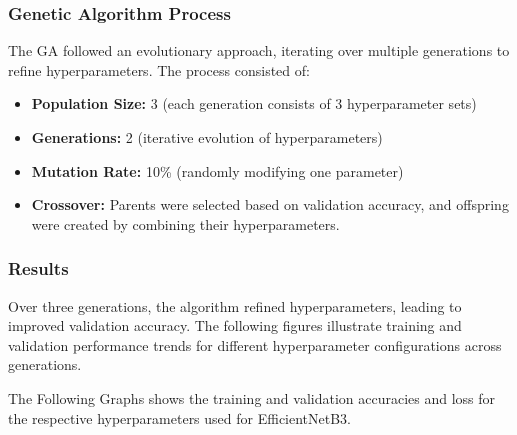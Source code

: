 \subsubsection{Genetic Algorithm Process}
The GA followed an evolutionary approach, iterating over multiple generations to refine hyperparameters. The process consisted of:

\begin{itemize}
    \item \textbf{Population Size:} 3 (each generation consists of 3 hyperparameter sets)
    \item \textbf{Generations:} 2 (iterative evolution of hyperparameters)
    \item \textbf{Mutation Rate:} 10\% (randomly modifying one parameter)
    \item \textbf{Crossover:} Parents were selected based on validation accuracy, and offspring were created by combining their hyperparameters.
\end{itemize}

\subsubsection{Results}
Over three generations, the algorithm refined hyperparameters, leading to improved validation accuracy. The following figures illustrate training and validation performance trends for different hyperparameter configurations across generations.

The Following Graphs shows the training and validation accuracies and loss for the respective hyperparameters used for EfficientNetB3.

